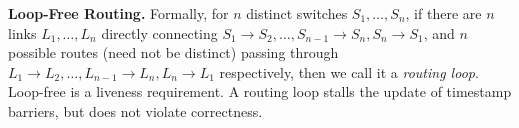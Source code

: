 \textbf{Loop-Free Routing.}
Formally, for $n$ distinct switches $S_1, \ldots, S_n$, if there are $n$ links $L_1, \ldots, L_n$ directly connecting $S_1 \rightarrow S_2, \ldots, S_{n-1} \rightarrow S_n, S_n \rightarrow S_1$, and $n$ possible routes (need not be distinct) passing through $L_1 \rightarrow L_2, \ldots, L_{n-1} \rightarrow L_n, L_n \rightarrow L_1$ respectively, then we call it a \textit{routing loop}.
Loop-free is a liveness requirement.
A routing loop stalls the update of timestamp barriers, but does not violate correctness.
\fi
